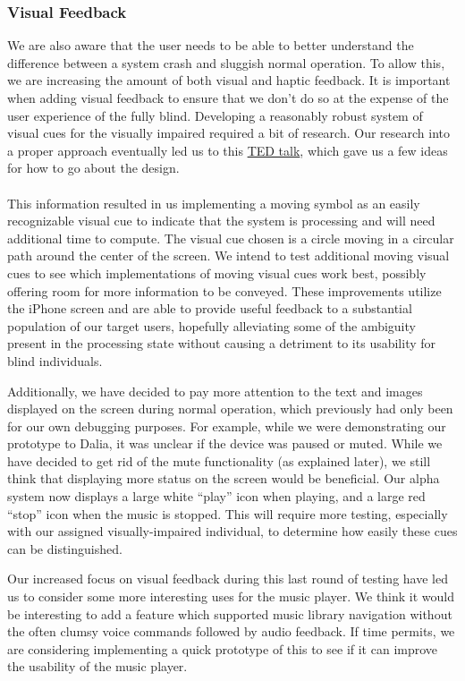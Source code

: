 \documentclass[10pt,letterpaper]{article}
\begin{document}
\subsubsection*{Visual Feedback}
We are also aware that the user needs to be able to better understand the difference between a system crash and sluggish normal operation. To allow this, we are increasing the amount of both visual and haptic feedback. It is important when adding visual feedback to ensure that we don't do so at the expense of the user experience of the fully blind. Developing a reasonably robust system of visual cues for the visually impaired required a bit of research. Our research into a proper approach eventually led us to this \href{http://www.ted.com/talks/lang/eng/pawan\_sinha\_on\_how\_brains\_learn\_to\_see.html}{TED talk}, which gave us a few ideas for how to go about the design.
\\ \\
This information resulted in us implementing a moving symbol as an easily recognizable visual cue to indicate that the system is processing and will need additional time to compute. The visual cue chosen is a circle moving in a circular path around the center of the screen. We intend to test additional moving visual cues to see which implementations of moving visual cues work best, possibly offering room for more information to be conveyed. These improvements utilize the iPhone screen and are able to provide useful feedback to a substantial population of our target users, hopefully alleviating some of the ambiguity present in the processing state without causing a detriment to its usability for blind individuals.

Additionally, we have decided to pay more attention to the text and images displayed on the screen during normal operation, which previously had only been for our own debugging purposes. For example, while we were demonstrating our prototype to Dalia, it was unclear if the device was paused or muted. While we have decided to get rid of the mute functionality (as explained later), we still think that displaying more status on the screen would be beneficial. Our alpha system now displays a large white ``play'' icon when playing, and a large red ``stop'' icon when the music is stopped. This will require more testing, especially with our assigned visually-impaired individual, to determine how easily these cues can be distinguished.

Our increased focus on visual feedback during this last round of testing have led us to consider some more interesting uses for the music player. We think it would be interesting to add a feature which supported music library navigation without the often clumsy voice commands followed by audio feedback. If time permits, we are considering implementing a quick prototype of this to see if it can improve the usability of the music player.
\end{document}
